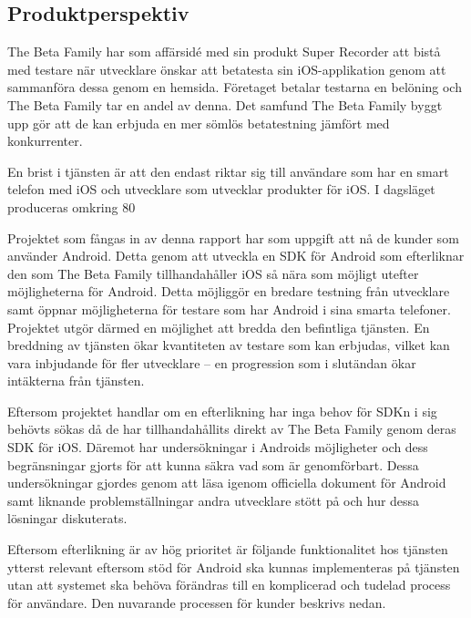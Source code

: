 \subsection{Produktperspektiv}

The Beta Family har som affärsidé med sin produkt Super Recorder att bistå med testare när utvecklare önskar att betatesta sin iOS-applikation genom att sammanföra dessa genom en hemsida. Företaget betalar testarna en belöning och The Beta Family tar en andel av denna. Det samfund The Beta Family byggt upp gör att de kan erbjuda en mer sömlös betatestning jämfört med konkurrenter. 

En brist i tjänsten är att den endast riktar sig till användare som har en smart telefon med iOS och utvecklare som utvecklar produkter för iOS. I dagsläget produceras omkring 80 %

Projektet som fångas in av denna rapport har som uppgift att nå de kunder som använder Android. Detta genom att utveckla en SDK för Android som efterliknar den som The Beta Family tillhandahåller iOS så nära som möjligt utefter möjligheterna för Android. Detta möjliggör en bredare testning från utvecklare samt öppnar möjligheterna för testare som har Android i sina smarta telefoner. Projektet utgör därmed en möjlighet att bredda den befintliga tjänsten. En breddning av tjänsten ökar kvantiteten av testare som kan erbjudas, vilket kan vara inbjudande för fler utvecklare – en progression som i slutändan ökar intäkterna från tjänsten.

Eftersom projektet handlar om en efterlikning har inga behov för SDKn i sig behövts sökas då de har tillhandahållits direkt av The Beta Family genom deras SDK för iOS. Däremot har undersökningar i Androids möjligheter och dess begränsningar gjorts för att kunna säkra vad som är genomförbart. Dessa undersökningar gjordes genom att läsa igenom officiella dokument för Android samt liknande problemställningar andra utvecklare stött på och hur dessa lösningar diskuterats.

Eftersom efterlikning är av hög prioritet är följande funktionalitet hos tjänsten ytterst relevant eftersom stöd för Android ska kunnas implementeras på tjänsten utan att systemet ska behöva förändras till en komplicerad och tudelad process för användare. Den nuvarande processen för kunder beskrivs nedan.

